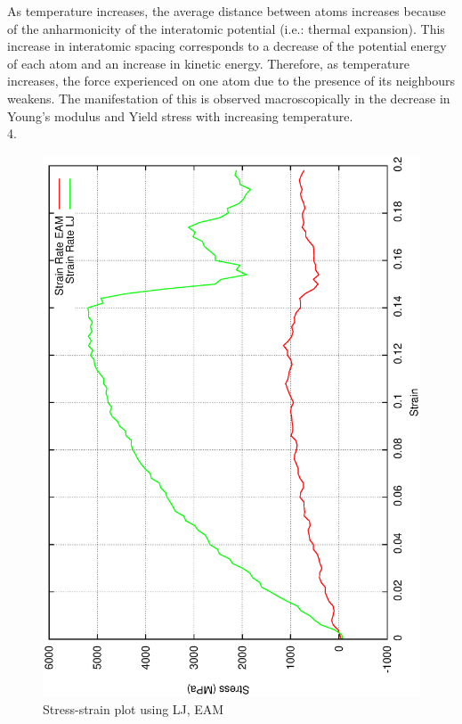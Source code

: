 \documentclass{article}
\begin{document}
As temperature increases, the average distance between atoms increases because of the anharmonicity of the interatomic potential (i.e.: thermal expansion). This increase in interatomic spacing corresponds to a decrease of the potential energy of each atom and an increase in kinetic energy. Therefore, as temperature increases, the force experienced on one atom due to the presence of its neighbours weakens. The manifestation of this is observed macroscopically in the decrease in Young's modulus and Yield stress with increasing temperature.\\
4.
\begin{figure}[h!]
\centering
\includegraphics[totalheight=0.5\textheight, angle=-90]{se_curve4}
\caption{Stress-strain plot using LJ, EAM }
\label{fig:aNicePicture}
\end{figure}
\end{document}
